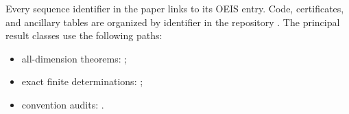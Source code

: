 Every sequence identifier in the paper links to its OEIS entry.  Code,
certificates, and ancillary tables are organized by identifier in the
repository \repo.  The principal result classes use the following paths:
\begin{itemize}[label={},leftmargin=1.2em]
\item all-dimension theorems: ;
\item exact finite determinations: ;
\item convention audits: .
\end{itemize}

